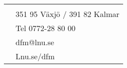 \thispagestyle{empty}
\null
\vfill
\begin{table}[bp]
	\begin{adjustwidth}{-1in}{-1in}%
		\begin{tabular}{p{4cm}l}
		& \\
		& 351 95 V\"{a}xj\"{o} / 391 82 Kalmar \\
		& Tel 0772-28 80 00 \\
		& dfm@lnu.se \\
		& Lnu.se/dfm
		\end{tabular}
	\end{adjustwidth}
\end{table}
